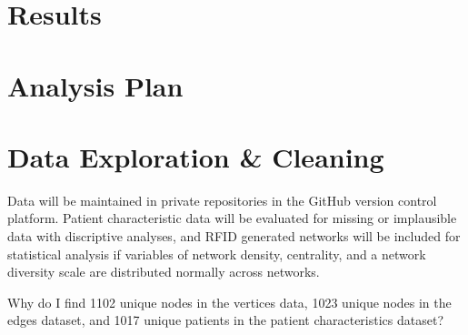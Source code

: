 \documentclass[]{elsarticle} %
\begin{document}
\section{Results}\label{results}

\section{Analysis Plan}\label{analysis-plan}

\section{Data Exploration \& Cleaning}\label{data-exploration-cleaning}

Data will be maintained in private repositories in the GitHub version
control platform. Patient characteristic data will be evaluated for
missing or implausible data with discriptive analyses, and RFID
generated networks will be included for statistical analysis if
variables of network density, centrality, and a network diversity scale
are distributed normally across networks.

Why do I find 1102 unique nodes in the vertices data, 1023 unique nodes
in the edges dataset, and 1017 unique patients in the patient
characteristics dataset?
\end{document}
